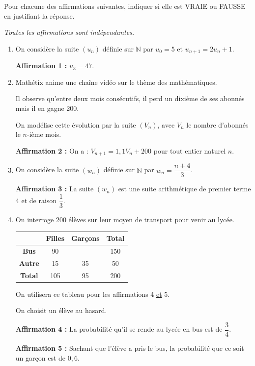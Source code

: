 Pour chacune des affirmations suivantes, indiquer si elle est VRAIE ou FAUSSE en justifiant la réponse.

\textit{Toutes les affirmations sont indépendantes.}

\begin{enumerate}
\item On considère la suite $(u_n)$ définie sur $\mathbb{N}$ par $u_0=5$ et $u_{n+1}=2u_n+1$.

\textbf{Affirmation 1 :} $u_3=47$.

\bigskip

\item Mathétix anime une chaîne vidéo sur le thème des mathématiques.

Il observe qu'entre deux mois consécutifs, il perd un dixième de ses abonnés mais il en gagne 200.

On modélise cette évolution par la suite $(V_n)$, avec $V_n$ le nombre d'abonnés le $n$-ième mois.

\textbf{Affirmation 2 :} On a : $V_{n+1}=1{,}1V_n+200$ pour tout entier naturel $n$.

\bigskip

\item On considère la suite $(w_n)$ définie sur $\mathbb{N}$ par $w_n=\dfrac{n+4}{3}$.

\textbf{Affirmation 3 :} La suite $(w_n)$ est une suite arithmétique de premier terme 4 et de raison $\dfrac{1}{3}$.

\bigskip

\item On interroge 200 élèves sur leur moyen de transport pour venir au lycée.
\begin{center}
\begin{tabular}{|c|c|c|c|}
\hline
 & \textbf{Filles} & \textbf{Garçons} & \textbf{Total}\\
\hline
\textbf{Bus} & 90 &  & 150\\
\hline
\textbf{Autre} & 15 & 35 & 50\\
\hline
\textbf{Total} & 105 & 95 & 200\\
\hline
\end{tabular}
\end{center}
On utilisera ce tableau pour les affirmations 4 \underline{et} 5.

On choisit un élève au hasard.

\bigskip

\textbf{Affirmation 4 :} La probabilité qu'il se rende au lycée en bus est de $\dfrac{3}{4}$.

\bigskip

\textbf{Affirmation 5 :} Sachant que l'élève a pris le bus, la probabilité que ce soit un garçon est de $0{,}6$.
\end{enumerate}
